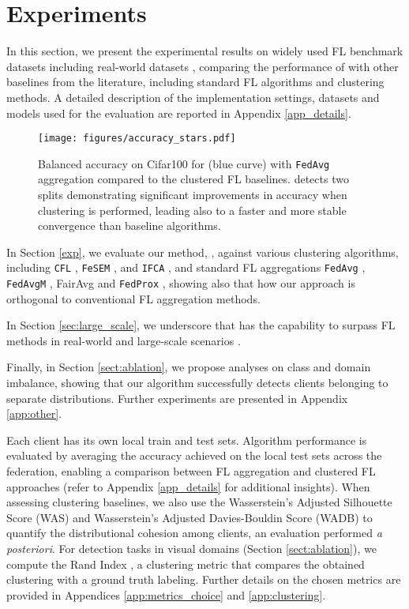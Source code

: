 \section{Experiments}
In this section, we present the experimental results on widely used FL benchmark datasets \citep{caldas2018leaf} including real-world datasets \citep{hsu2020federated}, comparing the performance of \shortname with other baselines from the literature, including standard FL algorithms and clustering methods.  A detailed description of the implementation settings, datasets and models used for the evaluation are reported in Appendix \ref{app_details}.
\begin{figure}[t]
    \centering
    \texttt{[image: figures/accuracy\_stars.pdf]}\vspace{-1.5em}
    \caption{\small{Balanced accuracy on Cifar100 for \shortname (blue curve) with \texttt{FedAvg} aggregation compared to the clustered FL baselines. \shortname detects two splits demonstrating significant improvements in accuracy when clustering is performed, leading also to a faster and more stable convergence than baseline algorithms.}}
    \label{fig:accuracy_jumpcifar100}
    \vspace{-1.3em}
\end{figure}
In Section \ref{exp}, we evaluate our method, \shortname, against various clustering algorithms, including \texttt{CFL} \citep{sattler2020clustered}, \texttt{FeSEM} \citep{long2023multi}, and \texttt{IFCA} \citep{ghosh2020efficient}, and standard FL aggregations \texttt{FedAvg} \citep{mcmahan2017communication}, \texttt{FedAvgM} \citep{asad2020fedopt}, FairAvg \citep{michieli2021all} and \texttt{FedProx} \citep{li2020federated}, showing also that how our approach is orthogonal to conventional FL aggregation methods.

In Section \ref{sec:large_scale}, we underscore that \shortname has the capability to surpass FL methods in real-world and large-scale scenarios \citep{hsu2020federated}.

Finally, in Section \ref{sect:ablation}, we propose analyses on class and domain imbalance, showing that our algorithm successfully detects clients belonging to separate distributions. Further experiments are presented in Appendix \ref{app:other}.

Each client has its own local train and test sets. Algorithm performance is evaluated by averaging the accuracy achieved on the local test sets across the federation, enabling a comparison between FL aggregation and clustered FL approaches (refer to Appendix \ref{app_details} for additional insights). When assessing clustering baselines, we also use the Wasserstein's Adjusted Silhouette Score (WAS) and Wasserstein's Adjusted Davies-Bouldin Score (WADB) to quantify the distributional cohesion among clients, an evaluation performed \textit{a posteriori}. For detection tasks in visual domains (Section \ref{sect:ablation}), we compute the Rand Index \citep{rand1971objective}, a clustering metric that compares the obtained clustering with a ground truth labeling. Further details on the chosen metrics are provided in Appendices \ref{app:metrics_choice} and \ref{app:clustering}.
